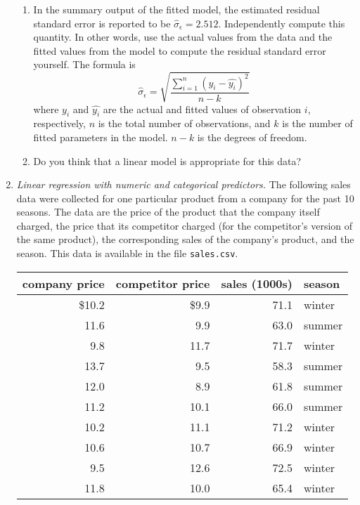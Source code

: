 \begin{enumerate}
\begin{enumerate}
  \item In the summary output of the fitted model, the estimated residual
    standard error is reported to be
    $\hat{\sigma}_{\epsilon}=2.512$. Independently compute this quantity. In
    other words, use the actual values from the data and the fitted
    values from the model to compute the residual standard error
    yourself.  The formula is
    \[ \hat{\sigma}_{\epsilon} = \sqrt{ \frac{\sum_{i=1}^n \left(y_i - \hat{y_i}\right)^2}{n-k}} \]
    where $y_i$ and $\hat{y_i}$ are the actual and fitted values of observation
    $i$, respectively, $n$ is the total number of observations, and $k$ is the
    number of fitted parameters in the model. $n-k$ is the degrees of freedom.

  \item Do you think that a linear model is appropriate for this data?
  \end{enumerate}

\item \emph{Linear regression with numeric and categorical predictors.}
  The following sales data were
  collected for one particular product from a company for the past 10
  seasons.  The data are the price of the product that the company
  itself charged, the price that its competitor charged (for the
  competitor's version of the same product), the corresponding sales
  of the company's product, and the season. This data is available
  in the file \texttt{sales.csv}.

\begin{center}
\begin{tabular}{rrrl}
company price & competitor price & sales (1000s) & season \\ \hline
         \$10.2         &     \$9.9  &71.1 &winter \\
         11.6         &     9.9  &63.0 &summer \\
          9.8         &    11.7  &71.7 &winter \\
         13.7         &     9.5  &58.3 &summer \\
         12.0         &     8.9  &61.8 &summer \\
         11.2         &    10.1  &66.0 &summer \\
         10.2         &    11.1  &71.2 &winter \\
         10.6         &    10.7  &66.9 &winter \\
          9.5         &    12.6  &72.5 &winter \\
         11.8         &    10.0  &65.4 &winter
\end{tabular}
\end{center}


\end{enumerate}
